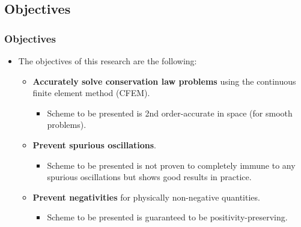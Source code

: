 \documentclass{beamer}
\begin{document}
\subsection{Objectives}
\begin{frame}
\frametitle{Objectives}

\begin{itemize}
   \item The objectives of this research are the following:
   \begin{itemize}
      \item \textbf{Accurately solve conservation law problems} using the
         continuous finite element method (CFEM).
      \begin{itemize}
         \item Scheme to be presented is 2nd order-accurate in space (for smooth
            problems).
      \end{itemize}
      \item \textbf{Prevent spurious oscillations}.
      \begin{itemize}
	 \item Scheme to be presented is not proven to completely immune to any
            spurious oscillations but shows good results in practice.
      \end{itemize}
      \item \textbf{Prevent negativities} for physically non-negative quantities.
      \begin{itemize}
         \item Scheme to be presented is guaranteed to be positivity-preserving.
      \end{itemize}
   \end{itemize}
\end{itemize}

\end{frame}
\end{document}

